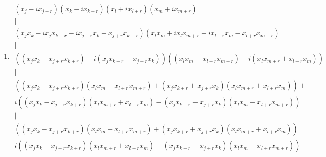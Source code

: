 \documentclass[aps,preprint]{revtex4}%
\begin{document}
\begin{enumerate}
\item
\begin{gather}
(x_{j}-ix_{j+r})(x_{k}-ix_{k+r})(x_{l}+ix_{l+r})(x_{m}+ix_{m+r})\\
\parallel\\
\left(  x_{j}x_{k}-ix_{j}x_{k+r}-ix_{j+r}x_{k}-x_{j+r}x_{k+r}\right)  \left(
x_{l}x_{m}+ix_{l}x_{m+r}+ix_{l+r}x_{m}-x_{l+r}x_{m+r}\right) \\
\parallel\\
\left(  \overset{}{\left(  \overset{}{x_{j}x_{k}-x_{j+r}x_{k+r}}\right)
-i\left(  \overset{}{x_{j}x_{k+r}+x_{j+r}x_{k}}\right)  }\right)  \left(
\overset{}{\left(  \overset{}{x_{l}x_{m}-x_{l+r}x_{m+r}}\right)  +i\left(
\overset{}{x_{l}x_{m+r}+x_{l+r}x_{m}}\right)  }\right) \\
\parallel\\
\left(  \overset{}{\left(  \overset{}{x_{j}x_{k}-x_{j+r}x_{k+r}}\right)
\left(  \overset{}{x_{l}x_{m}-x_{l+r}x_{m+r}}\right)  +\left(
\overset{}{x_{j}x_{k+r}+x_{j+r}x_{k}}\right)  \left(  \overset{}{x_{l}%
x_{m+r}+x_{l+r}x_{m}}\right)  }\right)  +\\
i\left(  \overset{}{\left(  \overset{}{x_{j}x_{k}-x_{j+r}x_{k+r}}\right)
\left(  \overset{}{x_{l}x_{m+r}+x_{l+r}x_{m}}\right)  -\left(
\overset{}{x_{j}x_{k+r}+x_{j+r}x_{k}}\right)  \left(  \overset{}{x_{l}%
x_{m}-x_{l+r}x_{m+r}}\right)  }\right)
\end{gather}%
\begin{gather}
\parallel\\
\left(  \overset{}{\left(  \overset{}{x_{j}x_{k}-x_{j+r}x_{k+r}}\right)
\left(  \overset{}{x_{l}x_{m}-x_{l+r}x_{m+r}}\right)  +\left(
\overset{}{x_{j}x_{k+r}+x_{j+r}x_{k}}\right)  \left(  \overset{}{x_{l}%
x_{m+r}+x_{l+r}x_{m}}\right)  }\right) \\
i\left(  \overset{}{\left(  \overset{}{x_{j}x_{k}-x_{j+r}x_{k+r}}\right)
\left(  \overset{}{x_{l}x_{m+r}+x_{l+r}x_{m}}\right)  -\left(
\overset{}{x_{j}x_{k+r}+x_{j+r}x_{k}}\right)  \left(  \overset{}{x_{l}%
x_{m}-x_{l+r}x_{m+r}}\right)  }\right)
\end{gather}



\end{enumerate}
\end{document}
